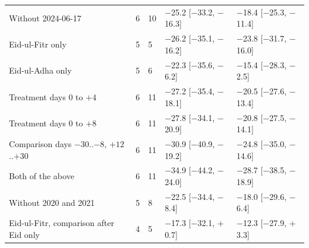 \begin{longtable}{L{6.0cm} C{0.7cm} C{1.1cm} C{3.0cm} C{3.0cm}}
Without 2024-06-17 & 6 & 10 & $-$25.2 {\scriptsize[$-$33.2, $-$16.3]} & $-$18.4 {\scriptsize[$-$25.3, $-$11.4]} \\
Eid-ul-Fitr only & 5 & 5 & $-$26.2 {\scriptsize[$-$35.1, $-$16.2]} & $-$23.8 {\scriptsize[$-$31.7, $-$16.0]} \\
Eid-ul-Adha only & 5 & 6 & $-$22.3 {\scriptsize[$-$35.6, $-$6.2]} & $-$15.4 {\scriptsize[$-$28.3, $-$2.5]} \\
Treatment days 0 to $+4$ & 6 & 11 & $-$27.2 {\scriptsize[$-$35.4, $-$18.1]} & $-$20.5 {\scriptsize[$-$27.6, $-$13.4]} \\
Treatment days 0 to $+8$ & 6 & 11 & $-$27.8 {\scriptsize[$-$34.1, $-$20.9]} & $-$20.8 {\scriptsize[$-$27.5, $-$14.1]} \\
Comparison days $-30$..$-8$, $+12$..$+30$ & 6 & 11 & $-$30.9 {\scriptsize[$-$40.9, $-$19.2]} & $-$24.8 {\scriptsize[$-$35.0, $-$14.6]} \\
Both of the above & 6 & 11 & $-$34.9 {\scriptsize[$-$44.2, $-$24.0]} & $-$28.7 {\scriptsize[$-$38.5, $-$18.9]} \\
Without 2020 and 2021 & 5 & 8 & $-$22.5 {\scriptsize[$-$34.4, $-$8.4]} & $-$18.0 {\scriptsize[$-$29.6, $-$6.4]} \\
Eid-ul-Fitr, comparison after Eid only & 4 & 5 & $-$17.3 {\scriptsize[$-$32.1, $+$0.7]} & $-$12.3 {\scriptsize[$-$27.9, $+$3.3]} \\
\end{longtable}
\endgroup
